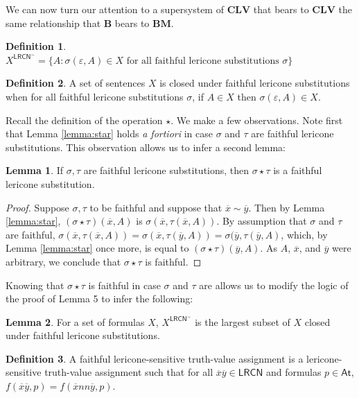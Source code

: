 \documentclass{amsart}
\theoremstyle{definition}
\newtheorem{lemma}{Lemma}
\newtheorem{mdef}{Definition}
\newcommand{\At}{\mathsf{At}}
\newcommand{\LRCN}{\mathsf{LRCN}}
\newcommand{\CLV}{\mathbf{CLV}}
\begin{document}
We can now turn our attention to a supersystem of $\CLV$ that bears to $\CLV$ the same relationship that $\mathbf{B}$ bears to $\mathbf{BM}$.

\begin{mdef}
    $X^{\mathsf{LRCN}^{\sim}}=\lbrace A:\sigma(\varepsilon,A)\in X\mbox{ for all faithful lericone substitutions }\sigma\rbrace$
\end{mdef}

\begin{mdef}
    A set of sentences $X$ is closed under faithful lericone substitutions when for all faithful lericone substitutions $\sigma$, if $A\in X$ then $\sigma(\varepsilon,A)\in X$.
\end{mdef}

Recall the definition of the operation $\star$. We make a few observations. Note first that Lemma \ref{lemma:star} holds \emph{a fortiori} in case $\sigma$ and $\tau$ are faithful lericone substitutions. This observation allows us to infer a second lemma:


\begin{lemma}
     If $\sigma,\tau$ are faithful lericone substitutions, then $\sigma\star \tau$ is a faithful lericone substitution.
\end{lemma}

\begin{proof}
    Suppose $\sigma,\tau$ to be faithful and suppose that $\overline{x}\sim\overline{y}$. Then by Lemma \ref{lemma:star},   $(\sigma\star\tau)(\overline{x},A)$ is $\sigma(\overline{x},\tau(\overline{x},A))$. By assumption that $\sigma$ and $\tau$ are faithful, $\sigma(\overline{x},\tau(\overline{x},A))=\sigma(\overline{x},\tau(\overline{y},A))=\sigma(\overline{y},\tau(\overline{y},A)$, which, by Lemma \ref{lemma:star} once more, is equal to $(\sigma\star\tau)(\overline{y},A)$. As $A$, $\overline{x}$, and $\overline{y}$ were arbitrary, we conclude that $\sigma\star\tau$ is faithful.
\end{proof}

Knowing that $\sigma\star\tau$ is faithful in case $\sigma$ and $\tau$ are allows us to modify the logic of the proof of Lemma 5 to infer the following:

\begin{lemma}
    For a set of formulas $X$, $X^{\LRCN^{\sim}}$ is the largest subset of $X$ closed under faithful lericone substitutions.
\end{lemma}

\begin{mdef}
    A faithful lericone-sensitive truth-value assignment is a lericone-sensitive truth-value assignment such that for all $\overline{x}\overline{y}\in\mathsf{LRCN}$ and formulas $p\in\At$, $f(\overline{x}\overline{y},p)=f(\overline{x}nn\overline{y},p)$. 
\end{mdef}
\end{document}
